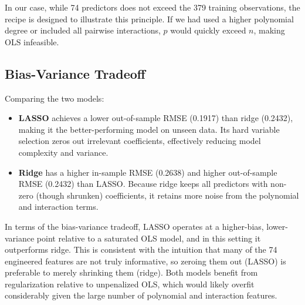 \documentclass[12pt]{article}
\begin{document}
In our case, while 74 predictors does not exceed the 379 training observations, the recipe is designed to illustrate this principle. If we had used a higher polynomial degree or included all pairwise interactions, $p$ would quickly exceed $n$, making OLS infeasible.

\subsection*{Bias-Variance Tradeoff}

Comparing the two models:

\begin{itemize}
    \item \textbf{LASSO} achieves a lower out-of-sample RMSE (0.1917) than ridge (0.2432), making it the better-performing model on unseen data. Its hard variable selection zeros out irrelevant coefficients, effectively reducing model complexity and variance.
    \item \textbf{Ridge} has a higher in-sample RMSE (0.2638) and higher out-of-sample RMSE (0.2432) than LASSO. Because ridge keeps all predictors with non-zero (though shrunken) coefficients, it retains more noise from the polynomial and interaction terms.
\end{itemize}

In terms of the bias-variance tradeoff, LASSO operates at a higher-bias, lower-variance point relative to a saturated OLS model, and in this setting it outperforms ridge. This is consistent with the intuition that many of the 74 engineered features are not truly informative, so zeroing them out (LASSO) is preferable to merely shrinking them (ridge). Both models benefit from regularization relative to unpenalized OLS, which would likely overfit considerably given the large number of polynomial and interaction features.
\end{document}
